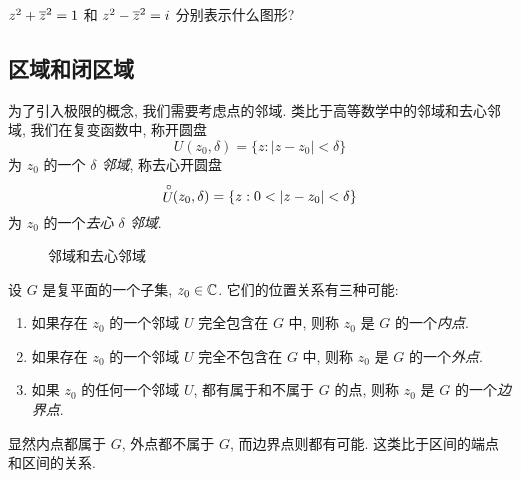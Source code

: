 \begin{exercise}
  $z^2+\overline z^2=1$ 和 $z^2-\overline z^2=i$ 分别表示什么图形?
\end{exercise}


\subsection{区域和闭区域}

为了引入极限的概念, 我们需要考虑点的邻域.
类比于高等数学中的邻域和去心邻域, 我们在复变函数中, 称开圆盘
  \[U(z_0,\delta)=\{z:|z-z_0|<\delta\}\]
为 $z_0$ 的一个 \emph{$\delta$ 邻域}, 称去心开圆盘
  \[\Uc(z_0,\delta)=\{z:0<|z-z_0|<\delta\}\]
为 $z_0$ 的一个\emph{去心 $\delta$ 邻域}.

\begin{figure}[hbpt]
  \centering
  \begin{minipage}{.48\textwidth}
    \centering
  \end{minipage}
  \begin{minipage}{.48\textwidth}
    \centering
  \end{minipage}
  \caption{邻域和去心邻域}
\end{figure}

设 $G$ 是复平面的一个子集, $z_0\in{\mathbb{C}}$.
它们的位置关系有三种可能:
\begin{enumerate}
  \item 如果存在 $z_0$ 的一个邻域 $U$ 完全包含在 $G$ 中, 则称 $z_0$ 是 $G$ 的一个\emph{内点}.
  \item 如果存在 $z_0$ 的一个邻域 $U$ 完全不包含在 $G$ 中, 则称 $z_0$ 是 $G$ 的一个\emph{外点}.
  \item 如果 $z_0$ 的任何一个邻域 $U$, 都有属于和不属于 $G$ 的点, 则称 $z_0$ 是 $G$ 的一个\emph{边界点}.
\end{enumerate}
显然内点都属于 $G$, 外点都不属于 $G$, 而边界点则都有可能.
这类比于区间的端点和区间的关系.


